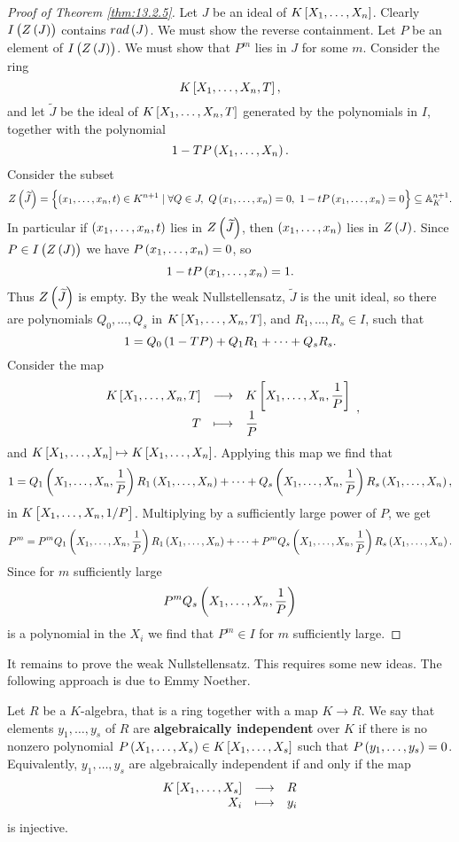 \begin{proof}[Proof of Theorem \ref{thm:13.2.5}]
Let $ J $ be an ideal of $ K\sbr{X_1, \dots, X_n} $. Clearly $ I\br{Z\br{J}} $ contains $ rad\br{J} $. We must show the reverse containment. Let $ P $ be an element of $ I\br{Z\br{J}} $. We must show that $ P^m $ lies in $ J $ for some $ m $. Consider the ring
$$ K\sbr{X_1, \dots, X_n, T}, $$
and let $ \widetilde{J} $ be the ideal of $ K\sbr{X_1, \dots, X_n, T} $ generated by the polynomials in $ I $, together with the polynomial
$$ 1 - TP\br{X_1, \dots, X_n}. $$
Consider the subset
$$ Z\br{\widetilde{J}} = \cbr{\br{x_1, \dots, x_n, t} \in K^{n + 1} \mid \forall Q \in J, \ Q\br{x_1, \dots, x_n} = 0, \ 1 - tP\br{x_1, \dots, x_n} = 0} \subseteq \A_K^{n + 1}. $$
In particular if $ \br{x_1, \dots, x_n, t} $ lies in $ Z\br{\widetilde{J}} $, then $ \br{x_1, \dots, x_n} $ lies in $ Z\br{J} $. Since $ P \in I\br{Z\br{J}} $ we have $ P\br{x_1, \dots, x_n} = 0 $, so
$$ 1 - tP\br{x_1, \dots, x_n} = 1. $$
Thus $ Z\br{\widetilde{J}} $ is empty. By the weak Nullstellensatz, $ \widetilde{J} $ is the unit ideal, so there are polynomials $ Q_0, \dots, Q_s $ in $ K\sbr{X_1, \dots, X_n, T} $, and $ R_1, \dots, R_s \in I $, such that
$$ 1 = Q_0\br{1 - TP} + Q_1R_1 + \dots + Q_sR_s. $$
Consider the map
$$ \function{K\sbr{X_1, \dots, X_n, T}}{K\sbr{X_1, \dots, X_n, \dfrac{1}{P}}}{T}{\dfrac{1}{P}}, $$
and $ K\sbr{X_1, \dots, X_n} \mapsto K\sbr{X_1, \dots, X_n} $. Applying this map we find that
$$ 1 = Q_1\br{X_1, \dots, X_n, \dfrac{1}{P}}R_1\br{X_1, \dots, X_n} + \dots + Q_s\br{X_1, \dots, X_n, \dfrac{1}{P}}R_s\br{X_1, \dots, X_n}, $$
in $ K\sbr{X_1, \dots, X_n, 1 / P} $. Multiplying by a sufficiently large power of $ P $, we get
$$ P^m = P^mQ_1\br{X_1, \dots, X_n, \dfrac{1}{P}}R_1\br{X_1, \dots, X_n} + \dots + P^mQ_s\br{X_1, \dots, X_n, \dfrac{1}{P}}R_s\br{X_1, \dots, X_n}. $$
Since for $ m $ sufficiently large
$$ P^mQ_s\br{X_1, \dots, X_n, \dfrac{1}{P}} $$
is a polynomial in the $ X_i $ we find that $ P^m \in I $ for $ m $ sufficiently large.
\end{proof}

It remains to prove the weak Nullstellensatz. This requires some new ideas. The following approach is due to Emmy Noether.

\pagebreak

\begin{definition}
Let $ R $ be a $ K $-algebra, that is a ring together with a map $ K \to R $. We say that elements $ y_1, \dots, y_s $ of $ R $ are \textbf{algebraically independent} over $ K $ if there is no nonzero polynomial $ P\br{X_1, \dots, X_s} \in K\sbr{X_1, \dots, X_s} $ such that $ P\br{y_1, \dots, y_s} = 0 $. Equivalently, $ y_1, \dots, y_s $ are algebraically independent if and only if the map
$$ \function{K\sbr{X_1, \dots, X_s}}{R}{X_i}{y_i} $$
is injective.
\end{definition}


